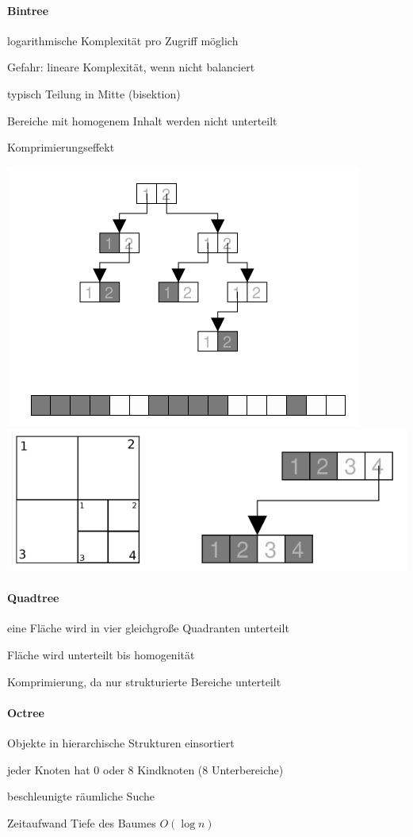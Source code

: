 \documentclass[landscape]{article}
\begin{document}
\begin{multicols}{3}
  \paragraph{Bintree}
  \begin{itemize*}
    \item logarithmische Komplexität pro Zugriff möglich
    \item Gefahr: lineare Komplexität, wenn nicht balanciert
    \item typisch Teilung in Mitte (bisektion)
    \item Bereiche mit homogenem Inhalt werden nicht unterteilt
    \item Komprimierungseffekt
  \end{itemize*}
  \begin{center}
    \includegraphics[width=.3 \linewidth]{Assets/Computergrafik_Bintrees}
    \includegraphics[width=.5 \linewidth]{Assets/Computergrafik_Quadtree}
  \end{center}
  
  \paragraph{Quadtree}
  \begin{itemize*}
    \item eine Fläche wird in vier gleichgroße Quadranten unterteilt
    \item Fläche wird unterteilt bis homogenität
    \item Komprimierung, da nur strukturierte Bereiche unterteilt
  \end{itemize*}
  
  \paragraph{Octree}
  \begin{itemize*}
    \item Objekte in hierarchische Strukturen einsortiert
    \item jeder Knoten hat 0 oder 8 Kindknoten (8 Unterbereiche)
    \item beschleunigte räumliche Suche
    \item Zeitaufwand Tiefe des Baumes $O(\log n)$
  \end{itemize*}
  

\end{multicols}
\end{document}
